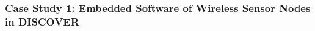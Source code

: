 

\subsubsection{Case Study 1: Embedded Software of Wireless Sensor Nodes in DISCOVER}
\label{sec:case-study:DISCOVER}

